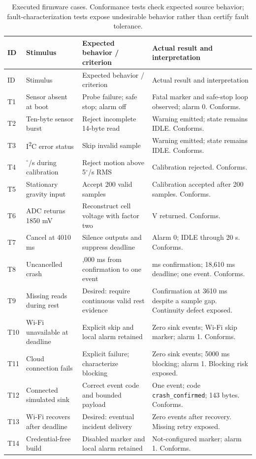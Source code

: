 \documentclass[10pt,a4paper]{article}
\newcommand{\degree}{\ensuremath{^{\circ}}}
\begin{document}
\begin{longtable}{@{}>{\raggedright\arraybackslash}p{.05\linewidth}>{\raggedright\arraybackslash}p{.20\linewidth}>{\raggedright\arraybackslash}p{.29\linewidth}>{\raggedright\arraybackslash}p{.35\linewidth}@{}}
\caption{Executed firmware cases. Conformance tests check expected source behavior; fault-characterization tests expose undesirable behavior rather than certify fault tolerance.}\label{tab:tests}\\
\toprule ID & Stimulus & Expected behavior / criterion & Actual result and interpretation\\\midrule\endfirsthead
\toprule ID & Stimulus & Expected behavior / criterion & Actual result and interpretation\\\midrule\endhead
T1 & Sensor absent at boot & Probe failure; safe stop; alarm off & Fatal marker and safe-stop loop observed; alarm 0. Conforms.\\
T2 & Ten-byte sensor burst & Reject incomplete 14-byte read & Warning emitted; state remains IDLE. Conforms.\\
T3 & I\textsuperscript{2}C error status & Skip invalid sample & Warning emitted; state remains IDLE. Conforms.\\
T4 & 100$\degree$/s during calibration & Reject motion above 5$\degree$/s RMS & Calibration rejected. Conforms.\\
T5 & Stationary gravity input & Accept 200 valid samples & Calibration accepted after 200 samples. Conforms.\\
T6 & ADC returns 1850 mV & Reconstruct cell voltage with factor two & 3.700 V returned. Conforms.\\
T7 & Cancel at 4010 ms & Silence outputs and suppress deadline & Alarm 0; IDLE through 20 s. Conforms.\\
T8 & Uncancelled crash & 15,000 ms from confirmation to one event & 3610 ms confirmation; 18,610 ms deadline; one event. Conforms.\\
T9 & Missing reads during rest & Desired: require continuous valid rest evidence & Confirmation at 3610 ms despite a sample gap. Continuity defect exposed.\\
T10 & Wi-Fi unavailable at deadline & Explicit skip and local alarm retained & Zero sink events; Wi-Fi skip marker; alarm 1. Conforms.\\
T11 & Cloud connection fails & Explicit failure; characterize blocking & Zero sink events; 5000 ms blocking; alarm 1. Blocking risk exposed.\\
T12 & Connected simulated sink & Correct event code and bounded payload & One event; code \texttt{crash\_confirmed}; 143 bytes. Conforms.\\
T13 & Wi-Fi recovers after deadline & Desired: eventual incident delivery & Zero events after recovery. Missing retry exposed.\\
T14 & Credential-free build & Disabled marker and local alarm retained & Not-configured marker; alarm 1. Conforms.\\\bottomrule
\end{longtable}
\end{document}
